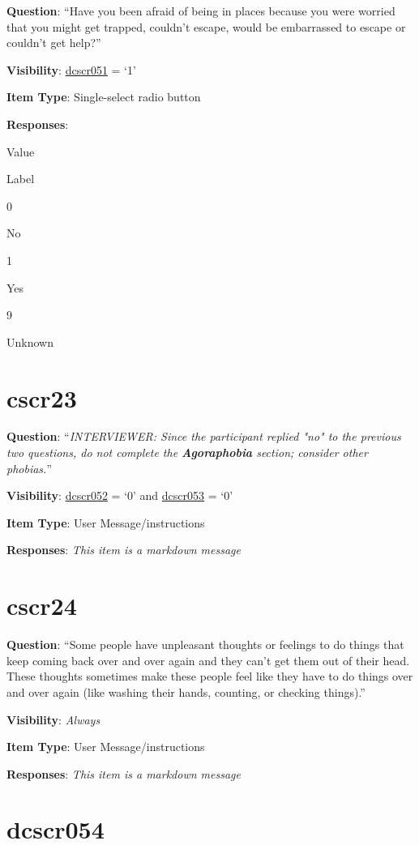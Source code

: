\documentclass[]{book}
\begin{document}
\textbf{Question}: ``Have you been afraid of being in places because you were worried that you might get trapped, couldn't escape, would be embarrassed to escape or couldn't get help?''

\textbf{Visibility}: \protect\hyperlink{dcscr051}{dcscr051} = `1'

\textbf{Item Type}: Single-select radio button

\textbf{Responses}:

Value

Label

0

No

1

Yes

9

Unknown

\hypertarget{cscr23}{%
\section{cscr23}\label{cscr23}}

\textbf{Question}: ``\emph{INTERVIEWER: Since the participant replied "no" to the previous two questions, do not complete the \textbf{Agoraphobia} section; consider other phobias.}''

\textbf{Visibility}: \protect\hyperlink{dcscr052}{dcscr052} = `0' and \protect\hyperlink{dcscr053}{dcscr053} = `0'

\textbf{Item Type}: User Message/instructions

\textbf{Responses}: \emph{This item is a markdown message}

\hypertarget{cscr24}{%
\section{cscr24}\label{cscr24}}

\textbf{Question}: ``Some people have unpleasant thoughts or feelings to do things that keep coming back over and over again and they can't get them out of their head. These thoughts sometimes make these people feel like they have to do things over and over again (like washing their hands, counting, or checking things).''

\textbf{Visibility}: \emph{Always}

\textbf{Item Type}: User Message/instructions

\textbf{Responses}: \emph{This item is a markdown message}

\hypertarget{dcscr054}{%
\section{dcscr054}\label{dcscr054}}
\end{document}
